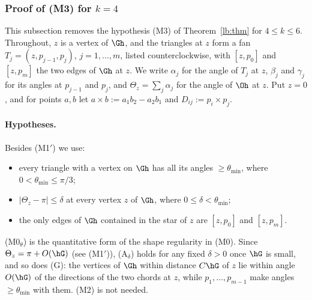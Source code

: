 
\subsubsection{Proof of (M3) for \texorpdfstring{$k=4$}{k=4}}\label{m3:sec}

This subsection removes the hypothesis (M3) of Theorem~\ref{lb:thm} for $4\le k\le 6$. Throughout, $z$ is a vertex of $\Gh$, and the triangles at $z$ form a fan $T_j=(z,p_{j-1},p_j)$, $j=1,\dots,m$, listed counterclockwise, with $[z,p_0]$ and $[z,p_m]$ the two edges of $\Gh$ at $z$. We write $\alpha_j$ for the angle of $T_j$ at $z$, $\beta_j$ and $\gamma_j$ for its angles at $p_{j-1}$ and $p_j$, and $\Theta_z=\sum_j\alpha_j$ for the angle of $\Oh$ at $z$. Put $z=0$, and for points $a,b$ let $a\times b:=a_1b_2-a_2b_1$ and $D_{ij}:=p_i\times p_j$.

\paragraph{Hypotheses.} Besides (M1$'$) we use:
\begin{itemize}
\item[(M0$_\theta$)] every triangle with a vertex on $\Gh$ has all its angles $\ge\theta_{\min}$, where $0<\theta_{\min}\le\pi/3$;
\item[(A$_\delta$)] $|\Theta_z-\pi|\le\delta$ at every vertex $z$ of $\Gh$, where $0\le\delta<\theta_{\min}$;
\item[(G)] the only edges of $\Gh$ contained in the star of $z$ are $[z,p_0]$ and $[z,p_m]$.
\end{itemize}
(M0$_\theta$) is the quantitative form of the shape regularity in (M0). Since $\Theta_z=\pi+O(\hG)$ (see (M1$'$)), (A$_\delta$) holds for any fixed $\delta>0$ once $\hG$ is small, and so does (G): the vertices of $\Gh$ within distance $C\hG$ of $z$ lie within angle $O(\hG)$ of the directions of the two chords at $z$, while $p_1,\dots,p_{m-1}$ make angles $\ge\theta_{\min}$ with them. (M2) is not needed.


